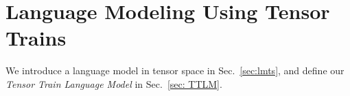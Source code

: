 \section{Language Modeling Using Tensor Trains}
\label{sec:ttlm}

We introduce a language model in tensor space in Sec.\ \ref{sec:lmts}, and define our \emph{Tensor Train Language Model} in Sec.\ \ref{sec: TTLM}. 





